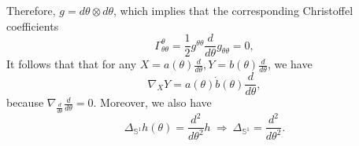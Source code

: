 \begin{enumerate}[label=\arabic{*}.]
\begin{equation*}
    \end{equation*}
    Therefore, $g = d\theta \otimes d\theta$, which implies that the corresponding Christoffel coefficients
    \begin{equation*}
        \Gamma^\theta_{\theta \theta} = \frac{1}{2}g^{\theta \theta} \frac{d}{d \theta} g_{\theta \theta} = 0,
    \end{equation*}
    It follows that that for any $X = a(\theta)\frac{d}{d \theta}, Y = b(\theta)\frac{d}{d \theta}$, we have
    \begin{equation*}
        \nabla_XY = a(\theta)\dot{b}(\theta)\frac{d}{d \theta},
    \end{equation*}
    because $\nabla_{\frac{d}{d \theta}}\frac{d}{d \theta} = 0$. Moreover, we also have
    \begin{equation*}
        \Delta_{\mathbb{S}^1} h(\theta) = \frac{d^2}{d\theta^2}h~\Rightarrow~\Delta_{\mathbb{S}^1} = \frac{d^2}{d\theta^2}.
    \end{equation*}


\end{enumerate}
